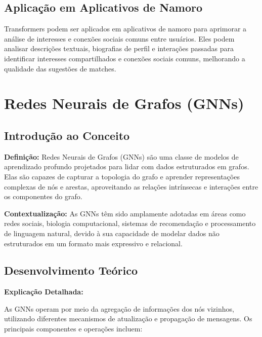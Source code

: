 \subsection{Aplicação em Aplicativos de Namoro}

Transformers podem ser aplicados em aplicativos de namoro para aprimorar a análise de interesses e conexões sociais comuns entre usuários. Eles podem analisar descrições textuais, biografias de perfil e interações passadas para identificar interesses compartilhados e conexões sociais comuns, melhorando a qualidade das sugestões de matches.

\section{Redes Neurais de Grafos (GNNs)}

\subsection{Introdução ao Conceito}
\textbf{}

\textbf{Definição:}  
Redes Neurais de Grafos (GNNs) são uma classe de modelos de aprendizado profundo projetados para lidar com dados estruturados em grafos. Elas são capazes de capturar a topologia do grafo e aprender representações complexas de nós e arestas, aproveitando as relações intrínsecas e interações entre os componentes do grafo.

\textbf{Contextualização:}  
As GNNs têm sido amplamente adotadas em áreas como redes sociais, biologia computacional, sistemas de recomendação e processamento de linguagem natural, devido à sua capacidade de modelar dados não estruturados em um formato mais expressivo e relacional.

\subsection{Desenvolvimento Teórico}
\textbf{}

\textbf{Explicação Detalhada:}

As GNNs operam por meio da agregação de informações dos nós vizinhos, utilizando diferentes mecanismos de atualização e propagação de mensagens. Os principais componentes e operações incluem:

